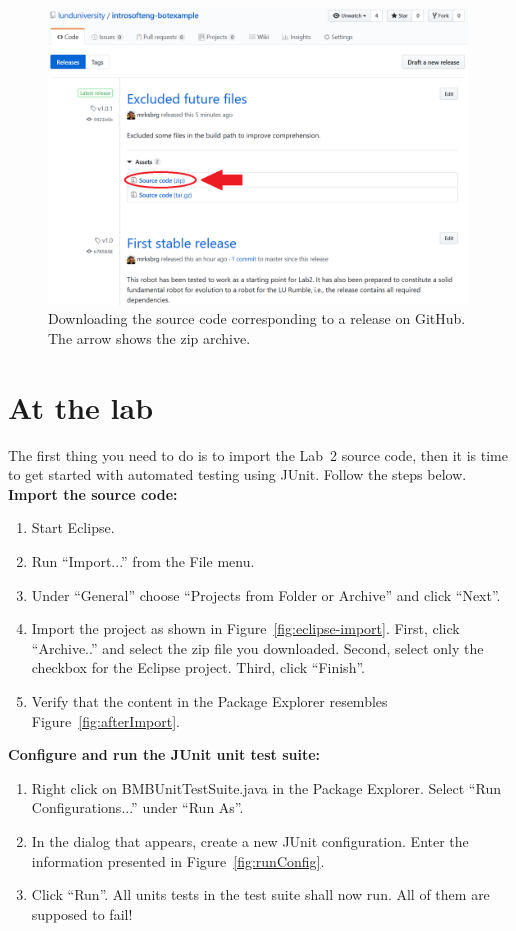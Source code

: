 \documentclass{scrreprt}
\begin{document}
\begin{figure}
\centering
\includegraphics[width=0.99\textwidth]{figures/GitHub-zip.png}
\caption{Downloading the source code corresponding to a release on GitHub. The arrow shows the zip archive.}
\label{fig:github-zip}
\end{figure}

\chapter{At the lab}
The first thing you need to do is to import the Lab~2 source code, then it is time to get started with automated testing using JUnit. Follow the steps below.\\

\textbf{Import the source code:}
\begin{enumerate}
\item Start Eclipse.
\item Run ``Import...'' from the File menu.
\item Under ``General'' choose ``Projects from Folder or Archive'' and click ``Next''.
\item Import the project as shown in Figure~\ref{fig:eclipse-import}. First, click ``Archive..'' and select the zip file you downloaded. Second, select only the checkbox for the Eclipse project. Third, click ``Finish''.
\item Verify that the content in the Package Explorer resembles Figure~\ref{fig:afterImport}.
\end{enumerate}

\textbf{Configure and run the JUnit unit test suite:}
\begin{enumerate}
\item Right click on BMBUnitTestSuite.java in the Package Explorer. Select ``Run Configurations...'' under ``Run As''.
\item In the dialog that appears, create a new JUnit configuration. Enter the information presented in Figure~\ref{fig:runConfig}.
\item Click ``Run''. All units tests in the test suite shall now run. All of them are supposed to fail!
\end{enumerate}
\end{document}
